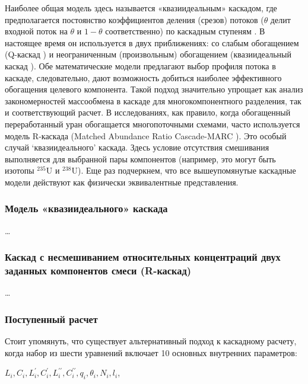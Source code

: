 Наиболее общая модель здесь называется «квазиидеальным» каскадом, где предполагается постоянство коэффициентов деления (срезов) потоков ($\theta$ делит входной поток на $\theta$ и $1 - \theta$ соответственно) по каскадным ступеням \cite{yamamotoMulticomponentIsotopeSeparating1978}. В настоящее время он используется в двух приближениях: со слабым обогащением (Q-каскад \cite{borisevichNewApproachOptimize2011, kolokoltsovDesignCascadesSeparating1970, zengQCascadeExplanation2012}) и неограниченным (произвольным) обогащением (квазиидеальный каскад \cite{sulaberidzeSpecialFeaturesEnrichment2006}). Обе математические модели предлагают выбор профиля потока в каскаде, следовательно, дают возможность добиться наиболее эффективного обогащения целевого компонента. Такой подход значительно упрощает как анализ закономерностей массообмена в каскаде для многокомпонентного разделения, так и соответствующий расчет. В исследованиях, как правило, когда обогащенный переработанный уран обогащается многопоточными схемами, часто используется модель R-каскада (Matched Abundance Ratio Cascade-MARC \cite{delagarzaMulticomponentIsotopeSeparation1961, woodEffectsSeparationProcesses2008, kazukihidaSimultaneousEvaluationEffects}). Это особый случай `квазиидеального' каскада. Здесь условие отсутствия смешивания выполняется для выбранной пары компонентов (например, это могут быть изотопы $^{235}$U и $^{238}$U). Еще раз подчеркнем, что все вышеупомянутые каскадные модели действуют как физически эквивалентные представления.


\subsubsection{Модель «квазиидеального» каскада}
\dots

\subsubsection{Каскад с несмешиванием относительных концентраций двух заданных компонентов смеси (R-каскад)}
\dots


\subsubsection{Поступенный расчет}

Стоит упомянуть, что существует альтернативный подход к каскадному расчету, когда набор из шести уравнений включает 10 основных внутренних параметров:

$L_{i}, C_{i}, L_{i}^{\prime}, C_{i}^{\prime}, L_{i}^{\prime \prime}, C_{i}^{\prime \prime}, q_{i}, \theta_{i}, N_{i}, l_{i}$,

